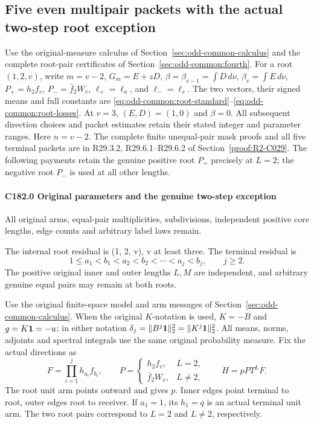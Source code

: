 \subsection{Five even multipair packets with the actual two-step root exception}\label{proof:Q5-C182}
Use the original-measure calculus of
Section~\ref{sec:odd-common-calculus} and the complete root-pair
certificates of Section~\ref{sec:odd-common:fourth}.
For a root \((1,2,v)\), write \(m=v-2\), \(G_m=E+zD\),
\(\beta=\beta_{v-1}=\int D\,d\nu\),
\(\beta_v=\int E\,d\nu\),
\(P_+=h_2f_v\), \(P_-=\bar f_2W_v\),
\(\ell_+=\ell_a\), and \(\ell_-=\ell_s\).
The two vectors, their signed means and full constants are
\eqref{eq:odd-common:root-standard}--\eqref{eq:odd-common:root-losses}.
At \(v=3\), \((E,D)=(1,0)\) and \(\beta=0\).
All subsequent direction choices and packet estimates retain their
stated integer and parameter ranges.
Here $n=v-2$. The complete finite unequal-pair mask proofs and all five terminal packets are in R29.3.2, R29.6.1--R29.6.2 of Section~\ref{proof:R2-C029}. The following payments retain the genuine positive root $P_+$ precisely at $L=2$; the negative root $P_-$ is used at all other lengths.
\paragraph{C182.0 Original parameters and the genuine two-step exception}

All original arms, equal-pair multiplicities, subdivisions, independent positive core lengths, edge counts and arbitrary label laws remain.

The internal root residual is (1, 2, v), v at least three. The terminal residual is
\[
 1\le a_1<b_1<a_2<b_2<\cdots<a_j<b_j,\qquad j\ge2.       \tag{C182.1}
\]
The positive original inner and outer lengths \(L,\allowbreak \allowbreak  M\) are independent, and arbitrary genuine equal pairs may remain at both roots.

Use the original finite-space model and arm messages of
Section~\ref{sec:odd-common-calculus}.
When the original \(K\)-notation is used, \(K=-B\) and
\(g=K\mathbf1=-u\); in either notation
\(\delta_j=\|B^j\mathbf1\|_2^2=\|K^j\mathbf1\|_2^2\).
All means, norms, adjoints and spectral integrals use the same
original probability measure.
Fix the actual directions as
\[
 F=\prod_{i=1}^j h_{a_i}f_{b_i},\qquad
 P=\begin{cases}h_2f_v,&L=2,\\\bar f_2W_v,&L\ne2,\end{cases}
 \qquad H=pP T^LF.                                    \tag{C182.2}
\]
The root unit arm points outward and gives \(p\). Inner edges point terminal to root, outer edges root to receiver. If \(a_1=1\), its \(h_1=q\) is an actual terminal unit arm. The two root pairs correspond to \(L=2\) and \(L\ne2\), respectively.

